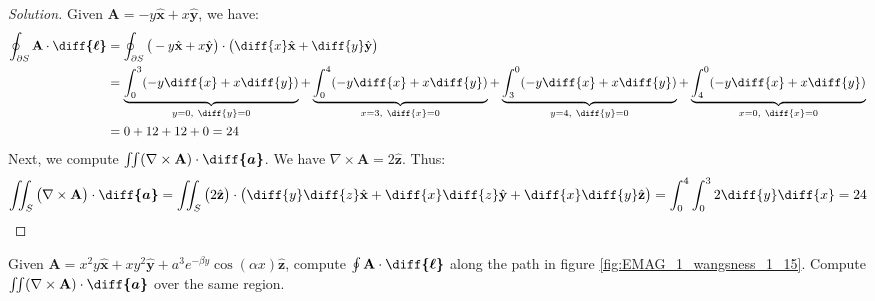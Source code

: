 \documentclass[crop=false,class=article,oneside]{standalone}
\begin{document}
        \begin{proof}[Solution]
            Given
            $\mathbf{A}=-y\hat{\mathbf{x}}+x\hat{\mathbf{y}}$,
            we have:
            \begin{align*}
                \oint_{\partial S}
                \mathbf{A}\cdot\boldsymbol{\diff{\ell}}
                &=\oint_{\partial{S}}\big(-y\hat{\mathbf{x}}
                +x\hat{\mathbf{y}}\big)
                \cdot\big(\diff{x}\hat{\mathbf{x}}
                +\diff{y}\hat{\mathbf{y}}\big)\\
                &=\underbrace{%
                    \int_{0}^{3}(-y\diff{x}+x\diff{y})
                }_{y=0,\ \diff{y}=0}
                +\underbrace{%
                    \int_{0}^{4}(-y\diff{x}+x\diff{y})
                }_{x=3,\ \diff{x}=0}
                +\underbrace{%
                    \int_{3}^{0}(-y\diff{x}+x\diff{y})
                }_{y=4,\ \diff{y}=0}
                +\underbrace{%
                    \int_{4}^{0}(-y\diff{x}+x\diff{y})
                }_{x=0,\ \diff{x}=0}\\
                &=0+12+12+0=24
            \end{align*}
            Next, we compute
            $\iint(\nabla\times\mathbf{A})%
             \cdot\boldsymbol{\diff{a}}$.
            We have
            $\nabla\times\mathbf{A}=%
             2\hat{\mathbf{z}}$.
            Thus:
            \begin{equation*}
                \iint_{S}\big(\nabla\times\mathbf{A}\big)
                \cdot\boldsymbol{\diff{a}}
                =\iint_{S}\big(2\hat{\mathbf{z}}\big)
                \cdot\big(\diff{y}\diff{z}\hat{\mathbf{x}}
                +\diff{x}\diff{z}\hat{\mathbf{y}}
                +\diff{x}\diff{y}\hat{\mathbf{z}}\big)
                =\int_{0}^{4}\int_{0}^{3}2\diff{y}\diff{x}
                =24
            \end{equation*}
        \end{proof}
        \begin{problem}[Wangsness 1-15]
            \label{problem:EMAG_1_wangsness_1_15}
            Given
            $\mathbf{A}%
             =x^{2}y\hat{\mathbf{x}}%
             +xy^{2}\hat{\mathbf{y}}%
             +a^{3}e^{-\beta{y}}\cos(\alpha{x})\hat{\mathbf{z}}$,
            compute
            $\oint\mathbf{A}\cdot\boldsymbol{\diff{\ell}}$
            along the path in figure
            \ref{fig:EMAG_1_wangsness_1_15}. Compute
            $\iint(\nabla\times\mathbf{A})%
             \cdot\boldsymbol{\diff{a}}$
            over the same region.
        \end{problem}
\end{document}
